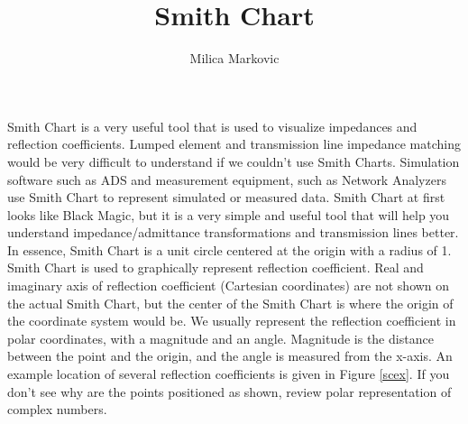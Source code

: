 \documentclass{ximera}
\title{Smith Chart}
\author{Milica Markovic}
\begin{document}
  
\begin{abstract}  

\end{abstract}  
\maketitle    







Smith Chart is a very useful tool that is used to visualize impedances and reflection coefficients. Lumped element and transmission line impedance matching would be very difficult to understand if we couldn't use Smith Charts. Simulation software such as ADS and measurement equipment, such as Network Analyzers use Smith Chart to represent simulated or measured data.   Smith Chart at first looks like Black Magic, but it is a very simple and useful tool that will help you understand impedance/admittance transformations and transmission lines better. In essence, Smith Chart is a unit circle centered at the origin with a radius of 1. Smith Chart is used to graphically represent reflection coefficient. Real and 
imaginary axis of reflection coefficient (Cartesian coordinates) are not shown on the actual Smith Chart, but the center of the Smith Chart is where the origin of the coordinate system would be. We usually represent the reflection coefficient in polar coordinates, with a
magnitude and an angle. Magnitude is the distance between the point and the origin, and the angle is measured from the x-axis. 
 An example location of several reflection coefficients is given in Figure \ref{scex}. If you don't see why are the points positioned as shown, review polar representation of complex numbers.
\end{document}
